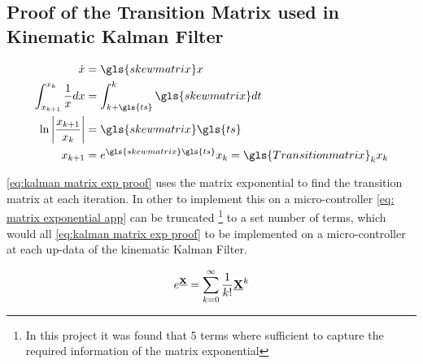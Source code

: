 \subsection{Proof of the Transition Matrix used in Kinematic Kalman Filter}

\begin{align}
\begin{split}
\dot{x} &= \gls{skewmatrix}x\\
\int_{x_{k+1}}^{x_{k}}\frac{1}{x}dx &= \int_{k + \gls{ts}}^{k}\gls{skewmatrix}dt\\
\ln\left|\frac{x_{k+1}}{x_{k}}\right| &= \gls{skewmatrix}\gls{ts}\\
x_{k+1} &= e^{\gls{skewmatrix}\gls{ts}}x_k = \gls{Transitionmatrix}_kx_k
\end{split}
\label{eq:kalman matrix exp proof}
\end{align}

\eqref{eq:kalman matrix exp proof} uses the matrix exponential to find the transition matrix at each iteration. In other to implement this on a micro-controller \eqref{eq: matrix exponential app} can be truncated \footnote{In this project it was found that 5 terms where sufficient to capture the required information of the matrix exponential} to a set number of terms, which would all \eqref{eq:kalman matrix exp proof} to be implemented on a micro-controller at each up-data of the kinematic Kalman Filter.

\begin{equation}
e^{\underline{\bf X}} = \sum_{k=0}^{\infty}\frac{1}{k!}{\underline{\bf X}}^k
\label{eq: matrix exponential app}
\end{equation}